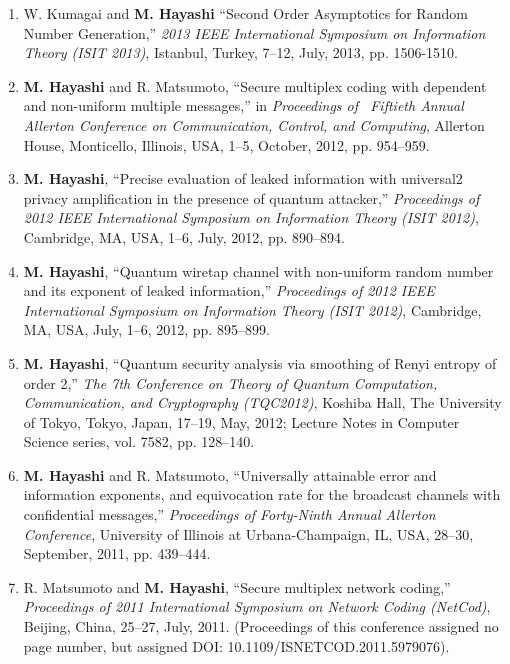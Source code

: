 \documentclass[a4paper,12pt,oneside]{article}
\begin{document}
\begin{enumerate}
    \item
    W. Kumagai and \textbf{M. Hayashi}
    ``Second Order Asymptotics for Random Number Generation,'' 
    {\em 2013 IEEE International Symposium on Information Theory (ISIT 2013)}, 
    Istanbul, Turkey, 7--12, July, 2013, pp. 1506-1510.
    
    \item \textbf{M. Hayashi} and R. Matsumoto, 
    ``Secure multiplex coding with dependent and non-uniform multiple messages,''
    in  \emph{Proceedings of \ Fiftieth Annual Allerton Conference on Communication, Control, and Computing}, 
    Allerton House, Monticello, Illinois, USA, 1--5, October, 2012, pp. 954--959.
    
    \item
    \textbf{M. Hayashi}, 
    ``Precise evaluation of leaked information with universal2 privacy amplification in the presence of quantum attacker,'' 
    {\em Proceedings of 2012 IEEE International Symposium on Information Theory (ISIT 2012)}, 
    Cambridge, MA, USA, 1--6, July, 2012, pp. 890--894. 
    
    \item	\textbf{M. Hayashi}, 
    ``Quantum wiretap channel with non-uniform random number and its exponent of leaked information,'' 
    {\em Proceedings of 2012 IEEE International Symposium on Information Theory (ISIT 2012)}, 
    Cambridge, MA, USA, July, 1--6, 2012, pp. 895--899. 
    
    \item	\textbf{M. Hayashi}, 
    ``Quantum security analysis via smoothing of Renyi entropy of order 2,''
    {\em The 7th Conference on Theory of Quantum Computation, Communication, and Cryptography (TQC2012)}, 
    Koshiba Hall, The University of Tokyo, Tokyo, Japan, 17--19, May, 2012; 
    Lecture Notes in Computer Science series, vol. 7582, pp. 128--140.
    
    \item	\textbf{M. Hayashi} and R. Matsumoto, 
    ``Universally attainable error and information exponents, and equivocation rate for the broadcast channels with confidential messages,''
    {\em Proceedings of Forty-Ninth Annual Allerton Conference}, 
    University of Illinois at Urbana-Champaign, IL, USA, 28--30, September, 2011, pp. 439--444. 
    
    \item	R. Matsumoto and \textbf{M. Hayashi}, 
    ``Secure multiplex network coding,'' 
    {\em Proceedings of 2011 International Symposium on Network Coding (NetCod)}, 
    Beijing, China, 25--27, July, 2011.
    (Proceedings of this conference assigned no page number, but assigned DOI: 10.1109/ISNETCOD.2011.5979076).
    

\end{enumerate}
\end{document}
